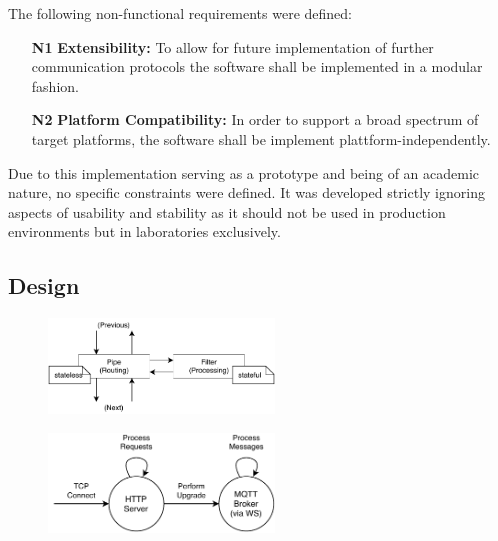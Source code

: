 The following non-functional requirements were defined:

\begin{itemize}
    \item [\textbf{N1}] \textbf{Extensibility:} To allow for future implementation of further communication protocols the software shall be implemented in a modular fashion.
    \item [\textbf{N2}] \textbf{Platform Compatibility:} In order to support a broad spectrum of target platforms, the software shall be implement plattform-independently.
\end{itemize}

Due to this implementation serving as a prototype and being of an academic nature, no specific constraints were defined. It was developed strictly ignoring aspects of usability and stability as it should not be used in production environments but in laboratories exclusively.

\subsection{Design}
\begin{figure}[t]
    \centering
    \includegraphics[width=6cm]{img/ch04/Architecture - Pipes and Filters.pdf}
    \label{fig:aws-statemachine}
\end{figure}


\begin{figure}[t]
    \centering
    \includegraphics[width=6cm]{img/ch04/Statemachine 2.pdf}
    \label{fig:aws-statemachine}
\end{figure}


